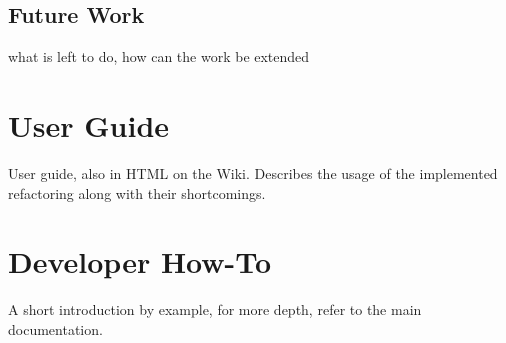 \documentclass[10pt,a4paper,oneside]{scrreprt}
\begin{document}
\section{Future Work}

what is left to do, how can the work be extended

\appendix

\chapter{User Guide} \label{chapter:user-guide}

User guide, also in HTML on the Wiki. Describes the usage of the implemented refactoring along with their shortcomings.

\chapter{Developer How-To} \label{chapter:developer-how-to}

A short introduction by example, for more depth, refer to the main documentation.





\clearpage
\bib
\end{document}
